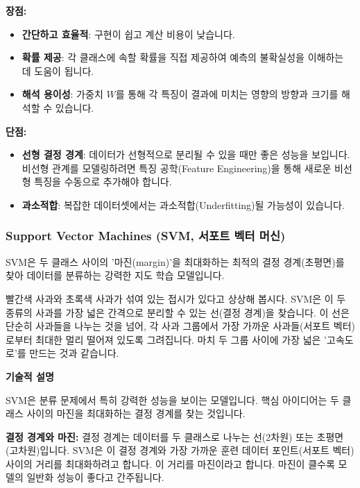\documentclass[11pt,a4paper]{article}
\theoremstyle{definition}
\begin{document}
\textbf{장점:}
\begin{itemize}
    \item \textbf{간단하고 효율적}: 구현이 쉽고 계산 비용이 낮습니다.
    \item \textbf{확률 제공}: 각 클래스에 속할 확률을 직접 제공하여 예측의 불확실성을 이해하는 데 도움이 됩니다.
    \item \textbf{해석 용이성}: 가중치 $W$를 통해 각 특징이 결과에 미치는 영향의 방향과 크기를 해석할 수 있습니다.
\end{itemize}

\textbf{단점:}
\begin{itemize}
    \item \textbf{선형 결정 경계}: 데이터가 선형적으로 분리될 수 있을 때만 좋은 성능을 보입니다. 비선형 관계를 모델링하려면 특징 공학(Feature Engineering)을 통해 새로운 비선형 특징을 수동으로 추가해야 합니다.
    \item \textbf{과소적합}: 복잡한 데이터셋에서는 과소적합(Underfitting)될 가능성이 있습니다.
\end{itemize}

\subsubsection{Support Vector Machines (SVM, 서포트 벡터 머신)}

\begin{summarybox}[title={한 줄 핵심 요약}]
SVM은 두 클래스 사이의 '마진(margin)'을 최대화하는 최적의 결정 경계(초평면)를 찾아 데이터를 분류하는 강력한 지도 학습 모델입니다.
\end{summarybox}

\begin{examplebox}[title={직관적 예시/비유}]
빨간색 사과와 초록색 사과가 섞여 있는 접시가 있다고 상상해 봅시다. SVM은 이 두 종류의 사과를 가장 넓은 간격으로 분리할 수 있는 선(결정 경계)을 찾습니다. 이 선은 단순히 사과들을 나누는 것을 넘어, 각 사과 그룹에서 가장 가까운 사과들(서포트 벡터)로부터 최대한 멀리 떨어져 있도록 그려집니다. 마치 두 그룹 사이에 가장 넓은 '고속도로'를 만드는 것과 같습니다.
\end{examplebox}

\textbf{기술적 설명}

SVM은 분류 문제에서 특히 강력한 성능을 보이는 모델입니다. 핵심 아이디어는 두 클래스 사이의 마진을 최대화하는 결정 경계를 찾는 것입니다.

\textbf{결정 경계와 마진:}
결정 경계는 데이터를 두 클래스로 나누는 선(2차원) 또는 초평면(고차원)입니다. SVM은 이 결정 경계와 가장 가까운 훈련 데이터 포인트(서포트 벡터) 사이의 거리를 최대화하려고 합니다. 이 거리를 마진이라고 합니다. 마진이 클수록 모델의 일반화 성능이 좋다고 간주됩니다.
\end{document}
